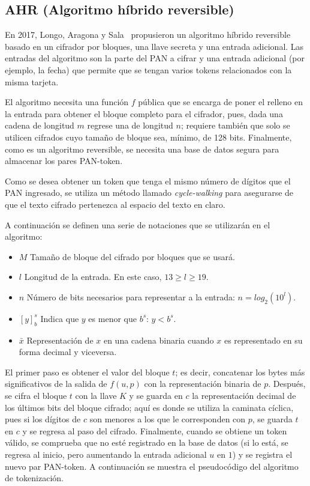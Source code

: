 %
%

\subsection{AHR (Algoritmo híbrido reversible)}

En 2017, Longo, Aragona y Sala~\cite{aragona} propusieron un algoritmo híbrido
reversible basado en un cifrador por bloques, una llave secreta y una entrada
adicional. Las entradas del algoritmo son la parte del PAN a cifrar y una
entrada adicional (por ejemplo, la fecha) que permite que se tengan varios
tokens relacionados con la misma tarjeta.

El algoritmo necesita una función $ f $ pública que se encarga de poner el
relleno en la entrada para obtener el bloque completo para el cifrador, pues,
dada una cadena de longitud $ m $ regrese una de longitud $ n $; requiere
también que solo se utilicen cifrados cuyo tamaño de bloque sea, mínimo, de 128
bits. Finalmente, como es un algoritmo reversible, se necesita una base de datos
segura para almacenar los pares PAN-token.

Como se desea obtener un token que tenga el mismo número de dígitos que el PAN
ingresado, se utiliza un método llamado \textit{cycle-walking} para asegurarse
de que el texto cifrado pertenezca al espacio del texto en claro.

A continuación se definen una serie de notaciones que se utilizarán en el
algoritmo:
\begin{itemize}
  \item $ M $ Tamaño de bloque del cifrado por bloques que se usará.
  \item $ l $ Longitud de la entrada. En este caso, $13 \geq l \geq 19$.
  \item $ n $ Número de bits necesarios para representar a la entrada:
    $n = log_2(10^l)$.
  \item $ [y]^s_b $ Indica que $y$ es menor que $b^s$: $y < b^s$.
  \item $\bar{x}$ Representación de $x$ en una cadena binaria cuando $x$ es
    representado en su forma decimal y viceversa.
\end{itemize}

El primer paso es obtener el valor del bloque $ t $; es decir, concatenar los
bytes más significativos de la salida de $ f (u,p) $ con la representación
binaria de $ p $. Después, se cifra el bloque $ t $ con la llave $ K $ y se
guarda en $ c $ la representación decimal de los  últimos bits del bloque
cifrado; aquí es donde se utiliza la caminata cíclica, pues si los dígitos de
$ c $ son menores a los que le corresponden con $ p $, se guarda $ t $ en $ c $
y se regresa al paso del cifrado. Finalmente, cuando se obtiene un token válido,
se comprueba que no esté registrado en la base de datos (si lo está, se regresa
al inicio, pero aumentando la entrada adicional $ u $ en $ 1 $) y se registra
el nuevo par PAN-token.
A continuación se muestra el pseudocódigo del algoritmo de tokenización.

